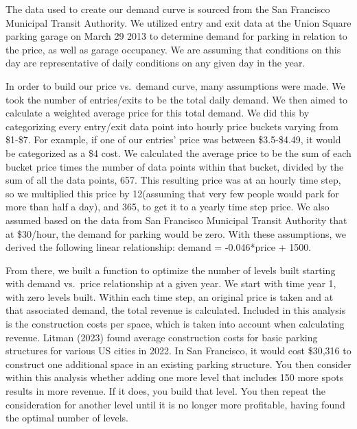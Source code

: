 \documentclass[
  letterpaper,
  DIV=11,
  numbers=noendperiod]{scrartcl}
\begin{document}
The data used to create our demand curve is sourced from the San
Francisco Municipal Transit Authority. We utilized entry and exit data
at the Union Square parking garage on March 29 2013 to determine demand
for parking in relation to the price, as well as garage occupancy. We
are assuming that conditions on this day are representative of daily
conditions on any given day in the year.

In order to build our price vs.~demand curve, many assumptions were
made. We took the number of entries/exits to be the total daily demand.
We then aimed to calculate a weighted average price for this total
demand. We did this by categorizing every entry/exit data point into
hourly price buckets varying from \$1-\$7. For example, if one of our
entries' price was between \$3.5-\$4.49, it would be categorized as a
\$4 cost. We calculated the average price to be the sum of each bucket
price times the number of data points within that bucket, divided by the
sum of all the data points, 657. This resulting price was at an hourly
time step, so we multiplied this price by 12(assuming that very few
people would park for more than half a day), and 365, to get it to a
yearly time step price. We also assumed based on the data from San
Francisco Municipal Transit Authority that at \$30/hour, the demand for
parking would be zero. With these assumptions, we derived the following
linear relationship: demand = -0.046*price + 1500.

From there, we built a function to optimize the number of levels built
starting with demand vs.~price relationship at a given year. We start
with time year 1, with zero levels built. Within each time step, an
original price is taken and at that associated demand, the total revenue
is calculated. Included in this analysis is the construction costs per
space, which is taken into account when calculating revenue. Litman
(2023) found average construction costs for basic parking structures for
various US cities in 2022. In San Francisco, it would cost \$30,316 to
construct one additional space in an existing parking structure. You
then consider within this analysis whether adding one more level that
includes 150 more spots results in more revenue. If it does, you build
that level. You then repeat the consideration for another level until it
is no longer more profitable, having found the optimal number of levels.
\end{document}
